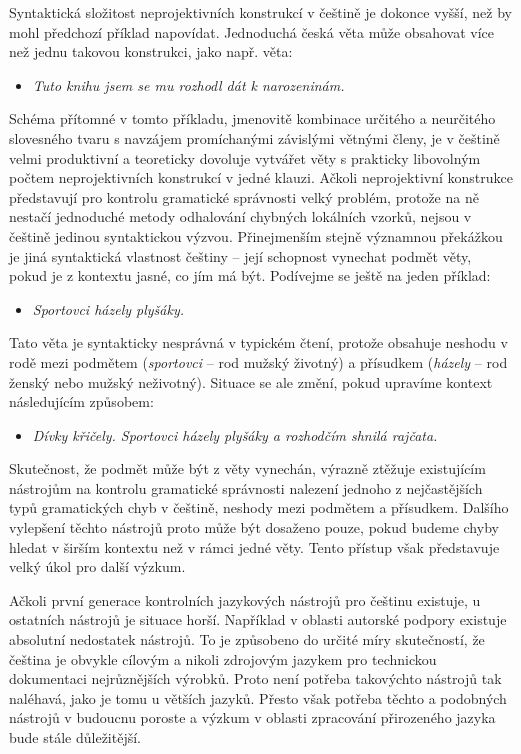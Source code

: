 \begin{multicols}{2}
Syntaktická složitost neprojektivních konstrukcí v češtině je dokonce vyšší, než by mohl předchozí příklad napovídat. Jednoduchá česká věta může obsahovat více než jednu takovou konstrukci, jako např. věta:
\begin{itemize}
\item[] \textit{Tuto knihu jsem se mu rozhodl dát k narozeninám.}
\end{itemize}
Schéma přítomné v tomto příkladu, jmenovitě kombinace určitého a neurčitého slovesného tvaru s navzájem promíchanými závislými větnými členy, je v češtině velmi produktivní a teoreticky dovoluje vytvářet věty s prakticky libovolným počtem neprojektivních konstrukcí v jedné klauzi.
Ačkoli neprojektivní konstrukce představují pro kontrolu gramatické správnosti velký problém, protože na ně nestačí jednoduché metody odhalování chybných lokálních vzorků, nejsou v češtině jedinou syntaktickou výzvou. Přinejmenším stejně významnou překážkou je jiná syntaktická vlastnost češtiny – její schopnost vynechat podmět věty, pokud je z kontextu jasné, co jím má být. Podívejme se ještě na jeden příklad:
\begin{itemize}
\item[]\textit{Sportovci házely plyšáky.}
\end{itemize}
Tato věta je syntakticky nesprávná v typickém čtení, protože obsahuje neshodu v rodě mezi podmětem (\textit{sportovci} – rod mužský životný) a přísudkem (\textit{házely} – rod ženský nebo mužský neživotný). Situace se ale změní, pokud upravíme kontext následujícím způsobem:
\begin{itemize}
\item[]\textit{Dívky křičely. Sportovci házely plyšáky a rozhodčím shnilá rajčata.}
\end{itemize}
Skutečnost, že podmět může být z věty vynechán, výrazně ztěžuje existujícím nástrojům na kontrolu gramatické správnosti nalezení jednoho z nejčastějších typů gramatických chyb v češtině, neshody mezi podmětem a přísudkem. Dalšího vylepšení těchto nástrojů proto může být dosaženo pouze, pokud budeme chyby hledat v širším kontextu než v rámci jedné věty. Tento přístup však představuje velký úkol pro další výzkum.

Ačkoli první generace kontrolních jazykových nástrojů pro češtinu existuje, u ostatních nástrojů je situace horší. Například v oblasti autorské podpory existuje absolutní nedostatek nástrojů. To je způsobeno do určité míry skutečností, že čeština je obvykle cílovým a nikoli zdrojovým jazykem pro technickou dokumentaci nejrůznějších výrobků. Proto není potřeba takovýchto nástrojů tak naléhavá, jako je tomu u větších jazyků. Přesto však potřeba těchto a podobných nástrojů v budoucnu poroste a výzkum v oblasti zpracování přirozeného jazyka bude stále důležitější.
  

\end{multicols}

